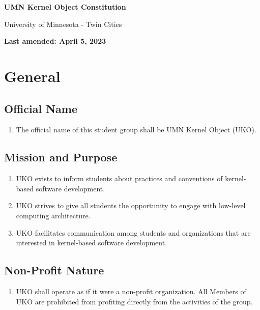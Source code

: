 \documentclass[12pt,executivepaper]{article}
\begin{document}
\begin{center}
    \Large
    \textbf{UMN Kernel Object Constitution}

    \smallskip

    \large
    University of Minnesota - Twin Cities

    \smallskip

    \normalsize
    \textbf{Last amended: April 5, 2023}
\end{center}

\section{General}

\subsection{Official Name}
\begin{enumerate}
    \item The official name of this student group shall be UMN Kernel Object
          (UKO).
\end{enumerate}

\subsection{Mission and Purpose}
\begin{enumerate}
    \item UKO exists to inform students about practices and conventions of
          kernel-based software development.
    \item UKO strives to give all students the opportunity to engage with
          low-level computing architecture.
    \item UKO facilitates communication among students and organizations that
          are interested in kernel-based software development.
\end{enumerate}

\subsection{Non-Profit Nature}
\begin{enumerate}
    \item UKO shall operate as if it were a non-profit organization. All
          Members of UKO are prohibited from profiting directly from the
          activities of the group.
\end{enumerate}
\end{document}
